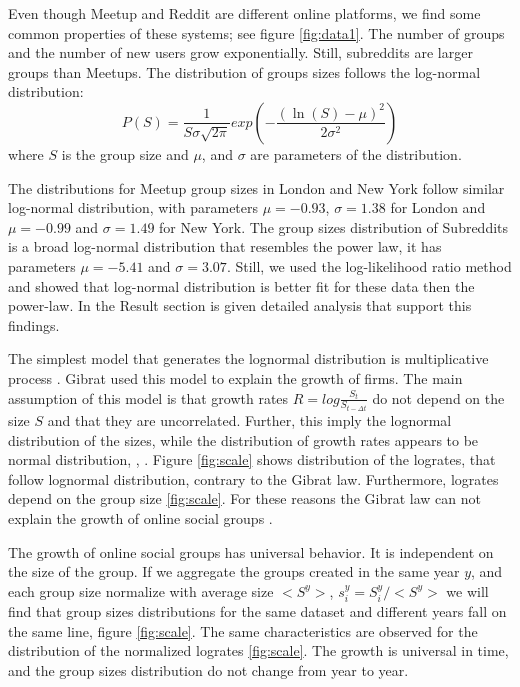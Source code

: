 Even though Meetup and Reddit are different online platforms, we find some common properties of these systems; see figure \ref{fig:data1}. The number of groups and the number of new users grow exponentially. Still, subreddits are larger groups than Meetups. The distribution of groups sizes follows the log-normal distribution:
\begin{equation}
P(S)=\frac{1}{S\sigma\sqrt{2\pi}}exp(-\frac{(\ln(S)-\mu)^{2}}{2\sigma^{2}})
\label{eq:log}
\end{equation}
where $S$ is the group size and $\mu$, and $\sigma$ are parameters of the distribution.

The distributions for Meetup group sizes in London and New York follow similar log-normal distribution, with parameters $\mu= -0.93$, $\sigma = 1.38$ for London and $\mu=-0.99$ and $\sigma=1.49$ for New York. The group sizes distribution of Subreddits is a broad log-normal distribution that resembles the power law, it has parameters $\mu= -5.41$ and $\sigma = 3.07$.   Still, we used the log-likelihood ratio method and showed that log-normal distribution is better fit for these data then the power-law. In the Result section is given detailed analysis that support this findings.   

The simplest model that generates the lognormal distribution is multiplicative process \cite{mitzenmacher2004brief}. Gibrat used this model to explain the growth of firms. The main assumption of this model is that growth rates  $R = log\frac{S_t}{S_{t-\Delta t}}$ do not depend on the size $S$ and that they are uncorrelated. Further, this imply the lognormal distribution of the sizes, while the distribution of growth rates appears to be normal distribution,  \cite{mondani2014fat}, \cite{fu2005growth}. Figure \ref{fig:scale} shows distribution of the logrates, that follow lognormal distribution, contrary to the Gibrat law. Furthermore, logrates depend on the group size \ref{fig:scale}. For these reasons the Gibrat law can not explain the growth of online social groups \cite{frasco2014spatially, qian2014origin}.    

The growth of online social groups has universal behavior. It is independent on the size of the group. If we aggregate the groups created in the same year $y$, and each group size normalize with average size $<S^y>$, $s^{y}_{i}=S^{y}_{i}/<S^{y}>$ we will find that group sizes distributions for the same dataset and different years fall on the same line, figure \ref{fig:scale}. The same characteristics are observed for the distribution of the normalized logrates \ref{fig:scale}. The growth is universal in time, and the group sizes distribution do not change from year to year.




